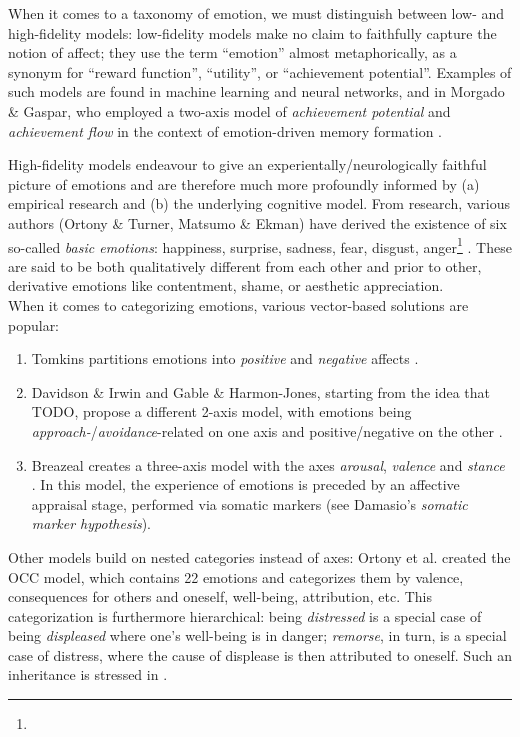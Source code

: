 \documentclass[]{scrartcl}
\begin{document}
\begin{shaded}

When it comes to a taxonomy of emotion, we must distinguish between low- and high-fidelity models: low-fidelity models make no claim to faithfully capture the notion of affect; they use the term ``emotion'' almost metaphorically, as a synonym for ``reward function'', ``utility'', or ``achievement potential''. Examples of such models are found in machine learning and neural networks, and in Morgado \& Gaspar, who employed a two-axis model of {\em achievement potential} and {\em achievement flow} in the context of emotion-driven memory formation \cite{morgado2005}.

High-fidelity models endeavour to give an experientally/neurologically faithful picture of emotions and are therefore much more profoundly informed by (a) empirical research and (b) the underlying cognitive model. From research, various authors (Ortony \& Turner, Matsumo \& Ekman) have derived the existence of six so-called {\em basic emotions}: happiness, surprise, sadness, fear, disgust, anger\footnote{} \cite[p. 24]{cambridgeAff}. These are said to be both qualitatively different from each other and prior to other, derivative emotions like contentment, shame, or aesthetic appreciation.\\

\noindent
When it comes to categorizing emotions, various vector-based solutions are popular:
\begin{enumerate}
	\item Tomkins partitions emotions into {\em positive} and {\em negative} affects \cite{tomkins1963}.
	\item Davidson \& Irwin and Gable \& Harmon-Jones, starting from the idea that TODO, propose a different 2-axis model, with emotions being {\em approach-}/{\em avoidance}-related on one axis and positive/negative on the other \cite{davidson1999,gable2008}.
	\item Breazeal creates a three-axis model with the axes {\em arousal}, {\em valence} and {\em stance} \cite{breazeal2003}. In this model, the experience of emotions is preceded by an affective appraisal stage, performed via somatic markers (see Damasio's {\em somatic marker hypothesis}).
\end{enumerate}

Other models build on nested categories instead of axes: Ortony et al. \cite{ortony1988} created the OCC model, which contains 22 emotions and categorizes them by valence, consequences for others and oneself, well-being, attribution, etc. This categorization is furthermore hierarchical: being {\em distressed} is a special case of being {\em displeased} where one's well-being is in danger; {\em remorse}, in turn, is a special case of distress, where the cause of displease is then attributed to oneself. Such an inheritance is stressed in \cite{steunebrink2009}.
\end{shaded}
\end{document}
